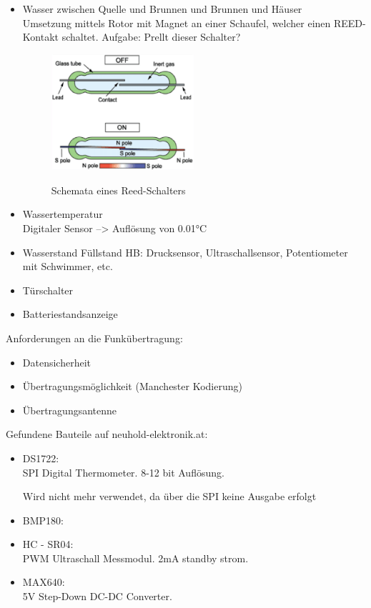 \documentclass[12pt,a4paper]{article}
\begin{document}
\begin{itemize}
	\item{Wasser zwischen Quelle und Brunnen und Brunnen und Häuser} \\
	 Umsetzung mittels Rotor mit Magnet an einer Schaufel, welcher einen
	 REED-Kontakt schaltet. Aufgabe: Prellt dieser Schalter?
	 \begin{figure}[H]
		\centering
		\includegraphics[width=0.5\textwidth]{Reed.png}
		\label{fig:reed}
		\caption{Schemata eines Reed-Schalters}
	\end{figure}

	\item{Wassertemperatur} \\
	Digitaler Sensor --> Auflösung von 0.01°C

	\item{Wasserstand}
	Füllstand HB: Drucksensor, Ultraschallsensor, Potentiometer mit
	Schwimmer, etc.

	\item{Türschalter}
	\item{Batteriestandsanzeige}


\end{itemize}

Anforderungen an die Funkübertragung:
\begin{itemize}
	\item{Datensicherheit}
	\item{Übertragungsmöglichkeit (Manchester Kodierung)}
	\item{Übertragungsantenne}
\end{itemize}

Gefundene Bauteile auf neuhold-elektronik.at:
\begin{itemize}
	\item{DS1722}: \\
	SPI Digital Thermometer. 8-12 bit Auflösung.
	
	Wird nicht mehr verwendet, da über die SPI keine Ausgabe erfolgt
	\item{BMP180}: \\

	\item{HC - SR04}: \\
	PWM Ultraschall Messmodul. 2mA standby strom.
	
	\item{MAX640}: \\
	5V Step-Down DC-DC Converter.

	
\end{itemize}
\end{document}
